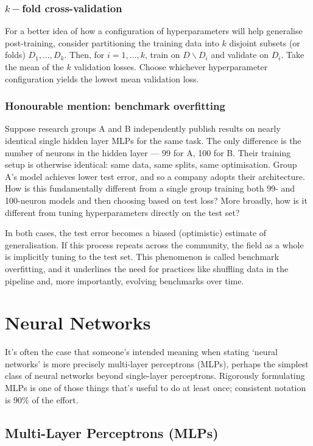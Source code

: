 \documentclass[11pt]{article}
\begin{document}
\subsubsection{$k-$fold cross-validation}
For a better idea of how a configuration of hyperparameters will help generalise post-training, consider partitioning the training data into $k$ disjoint subsets (or folds) $D_1,\dots,D_k$. Then, for $i=1,\dots,k$, train on $D\backslash D_i$ and validate on $D_i$. Take the mean of the $k$ validation losses. Choose whichever hyperparameter configuration yields the lowest mean validation loss.

\subsubsection{Honourable mention: benchmark overfitting}
Suppose research groups A and B independently publish results on nearly identical single hidden layer MLPs for the same task. The only difference is the number of neurons in the hidden layer — 99 for A, 100 for B. Their training setup is otherwise identical: same data, same splits, same optimisation. Group A's model achieves lower test error, and so a company adopts their architecture. How is this fundamentally different from a single group training both 99- and 100-neuron models and then choosing based on test loss? More broadly, how is it different from tuning hyperparameters directly on the test set?

In both cases, the test error becomes a biased (optimistic) estimate of generalisation. If this process repeats across the community, the field as a whole is implicitly tuning to the test set. This phenomenon is called benchmark overfitting, and it underlines the need for practices like shuffling data in the pipeline and, more importantly, evolving benchmarks over time.

\section{Neural Networks}
It's often the case that someone's intended meaning when stating `neural networks' is more precisely multi-layer perceptrons (MLPs), perhaps the simplest class of neural networks beyond single-layer perceptrons. Rigorously formulating MLPs is one of those things that's useful to do at least once; consistent notation is 90\% of the effort.

\subsection{Multi-Layer Perceptrons (MLPs)}
\label{sec:multi_layer_perceptrons}
\end{document}
